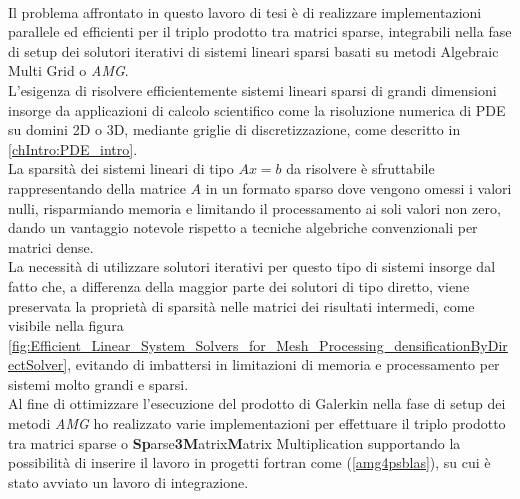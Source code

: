\label{abstract}

\\
Il problema affrontato in questo lavoro di tesi è di realizzare implementazioni 
parallele ed efficienti per il triplo prodotto tra matrici sparse,
integrabili nella fase di setup dei solutori iterativi di sistemi lineari sparsi basati su metodi 
Algebraic Multi Grid o \emph{AMG}.\\
L'esigenza di risolvere efficientemente sistemi lineari sparsi di grandi dimensioni 
insorge da applicazioni di calcolo scientifico come la risoluzione numerica di PDE su domini 2D o 3D, 
mediante griglie di discretizzazione, come descritto in \ref{chIntro:PDE_intro}.\\
La sparsità dei sistemi lineari di tipo $Ax=b$ da risolvere è sfruttabile rappresentando 
della matrice $A$ in un formato sparso dove vengono omessi i valori nulli,
risparmiando memoria e limitando il processamento ai soli valori non zero,
dando un vantaggio notevole rispetto a tecniche algebriche convenzionali per matrici dense.\\
La necessità di utilizzare solutori iterativi per questo tipo di sistemi 
insorge dal fatto che, a differenza della maggior parte dei solutori di tipo diretto, 
viene preservata la proprietà di sparsità nelle matrici dei risultati intermedi,
come visibile nella figura \ref{fig:Efficient_Linear_System_Solvers_for_Mesh_Processing_densificationByDirectSolver},
evitando di imbattersi in limitazioni di memoria e processamento per sistemi molto grandi e sparsi.\\
Al fine di ottimizzare l'esecuzione del prodotto di Galerkin nella fase di setup 
dei metodi \emph{AMG} ho realizzato varie implementazioni per effettuare 
il triplo prodotto tra matrici sparse o {\bf{Sp}}arse{\bf{3}}{\bf{M}}atrix{\bf{M}}atrix Multiplication
supportando la possibilità di inserire il lavoro in progetti fortran come  (\ref{amg4psblas}),
su cui è stato avviato un lavoro di integrazione.

